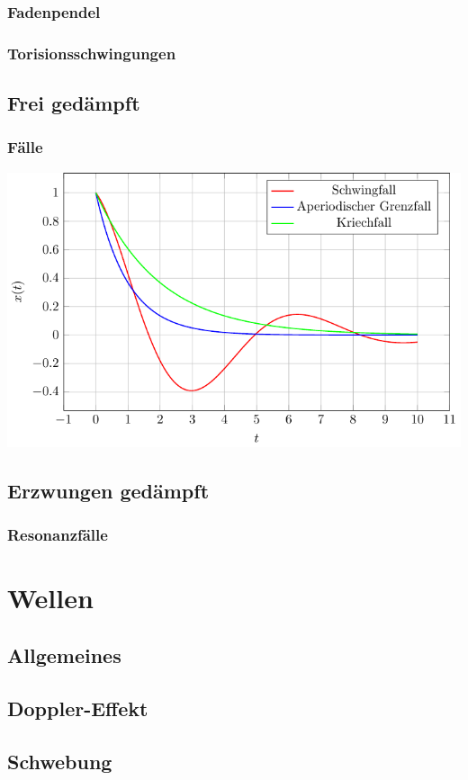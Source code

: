 \documentclass[german]{latex4ei/latex4ei_sheet}
\begin{document}
\subsubsection{Fadenpendel}
\subsubsection{Torisionsschwingungen}
\subsection{Frei gedämpft}
\subsubsection{Fälle}
\includegraphics[width=.9\columnwidth]{img/Schwingungen.pdf}
\subsection{Erzwungen gedämpft}
\subsubsection{Resonanzfälle}

\section{Wellen}
\subsection{Allgemeines}
\subsection{Doppler-Effekt}
\subsection{Schwebung}
\end{document}
